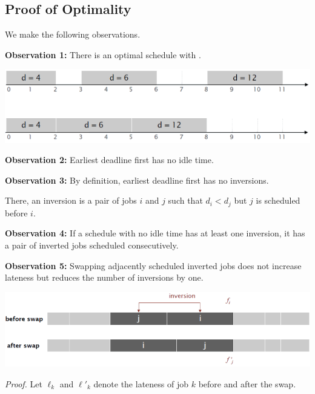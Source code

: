 \subsection{Proof of Optimality}

We make the following observations.

\begin{listu}
    \item \textbf{Observation 1:} There is an optimal schedule with .

    \begin{center}
        \includegraphics[width=0.67\linewidth]{figures/minimizing-lateness-observation-1.png}
    \end{center}

    \item \textbf{Observation 2:} Earliest deadline first has no idle time.

    \item \textbf{Observation 3:} By definition, earliest deadline first has no inversions.

    There, an inversion is a pair of jobs $i$ and $j$ such that $d_i < d_j$ but $j$ is scheduled before $i$.

    \item \textbf{Observation 4:} If a schedule with no idle time has at least one inversion, it has a pair of inverted jobs scheduled consecutively.

    \item \textbf{Observation 5:} Swapping adjacently scheduled inverted jobs does not increase lateness but reduces the number of inversions by one.

    \begin{center}
        \includegraphics[width=0.67\linewidth]{figures/minimizing-lateness-observation-5.png}
    \end{center}

    \textit{Proof.}
        Let $\ell_k$ and $\ell'_k$ denote the lateness of job $k$ before and after the swap.


\end{listu}
